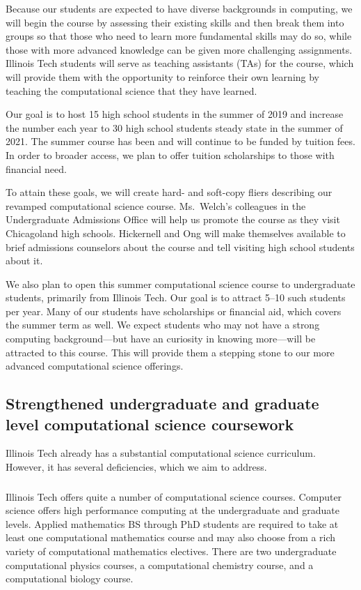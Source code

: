 \documentclass[11pt]{NSFamsart}
\begin{document}
Because our students are expected to have diverse backgrounds in computing, we will begin the course by assessing their existing skills and then break them into groups so that those who need to learn more fundamental skills may do so, while those with more advanced knowledge can be given more challenging assignments.  Illinois Tech students will serve as teaching assistants (TAs) for the course, which will provide them with the opportunity to reinforce their own learning by teaching the computational science that they have learned. 

Our goal is to host 15 high school students in the summer of 2019 and increase the number each year to 30 high school students steady state in the summer of 2021.  The summer course has been and will continue to be funded by tuition fees.  In order to broader access, we plan to offer tuition scholarships to those with financial need.

To attain these goals, we will create hard- and soft-copy fliers describing our revamped computational science course. Ms.~Welch's colleagues in the Undergraduate Admissions Office will help us promote the course as they visit Chicagoland high schools.  Hickernell and Ong will make themselves available to brief admissions counselors about the course and tell visiting high school students about it.

We also plan to open this summer computational science course to undergraduate students, primarily from Illinois Tech.  Our goal is to attract 5--10 such students per year.  Many of our students have scholarships or financial aid, which covers the summer term as well.  We expect students who may not have a strong computing background---but have an curiosity in knowing more---will be attracted to this course.  This will provide them a stepping stone to our more advanced computational science offerings.


\subsection{Strengthened undergraduate and graduate level computational science coursework} \label{Curr} 
Illinois Tech already has a substantial computational science curriculum.  However, it has several deficiencies, which we aim to address.

\subsubsection{\CurrExistName} \label{CurrExist} Illinois Tech offers quite a number of computational science courses.  Computer science offers high performance computing at the undergraduate and graduate levels.  Applied mathematics BS through PhD students are required to take at least one computational mathematics course and may also choose from a rich variety of computational mathematics electives. There are two undergraduate computational physics courses, a computational chemistry course, and a computational biology course.
\end{document}

